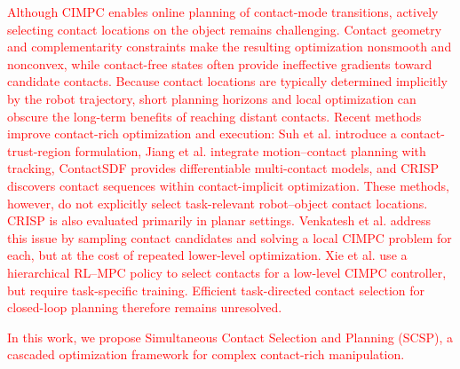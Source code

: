 \textcolor{red}{
Although CIMPC enables online planning of contact-mode transitions, actively selecting contact locations on the object remains challenging. Contact geometry and complementarity constraints make the resulting optimization nonsmooth and nonconvex, while contact-free states often provide ineffective gradients toward candidate contacts. Because contact locations are typically determined implicitly by the robot trajectory, short planning horizons and local optimization can obscure the long-term benefits of reaching distant contacts. Recent methods improve contact-rich optimization and execution: Suh et al. \cite{suh2025dexterous} introduce a contact-trust-region formulation, Jiang et al. \cite{jiang2025robust} integrate motion--contact planning with tracking, ContactSDF \cite{yang2024contactsdf} provides differentiable multi-contact models, and CRISP \cite{li2025surprising} discovers contact sequences within contact-implicit optimization. These methods, however, do not explicitly select task-relevant robot--object contact locations. CRISP is also evaluated primarily in planar settings. Venkatesh et al. \cite{venkatesh2025approximating} address this issue by sampling contact candidates and solving a local CIMPC problem for each, but at the cost of repeated lower-level optimization. Xie et al. \cite{xie2026touch} use a hierarchical RL--MPC policy to select contacts for a low-level CIMPC controller, but require task-specific training. Efficient task-directed contact selection for closed-loop planning therefore remains unresolved.
}

\textcolor{red}{
In this work, we propose Simultaneous Contact Selection and Planning (SCSP), a cascaded optimization framework for complex contact-rich manipulation. 
}

